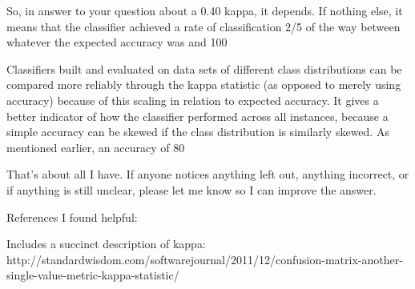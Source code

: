 \documentclass[caret-main.tex]{subfiles}
\begin{document}
So, in answer to your question about a 0.40 kappa, it depends. If nothing else, it means that the classifier achieved a rate of classification 2/5 of the way between whatever the expected accuracy was and 100%

Classifiers built and evaluated on data sets of different class distributions can be compared more reliably through the kappa statistic (as opposed to merely using accuracy) because of this scaling in relation to expected accuracy. It gives a better indicator of how the classifier performed across all instances, because a simple accuracy can be skewed if the class distribution is similarly skewed. As mentioned earlier, an accuracy of 80%

That's about all I have. If anyone notices anything left out, anything incorrect, or if anything is still unclear, please let me know so I can improve the answer.

References I found helpful:

Includes a succinct description of kappa: http://standardwisdom.com/softwarejournal/2011/12/confusion-matrix-another-single-value-metric-kappa-statistic/

\end{document}
